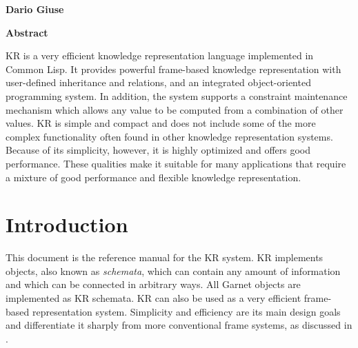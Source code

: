 \begin{titlepage}
\begin{titlebox}
\vspace{0.6 inch}

{\bf Dario Giuse}
\vspace{0.3 line}
\value{date}
\end{titlebox}
\vspace{0.1 inch}
\begin{center}
{\bf Abstract}\end{center}
\begin{text}
KR is a very efficient knowledge representation language implemented in
Common Lisp.  It provides powerful frame-based knowledge representation
with user-defined inheritance and relations, and an integrated
object-oriented programming system.  In addition, the system supports a
constraint maintenance mechanism which allows any value to be computed from
a combination of other values.  KR is simple and compact and does not
include some of the more complex functionality often found in other
knowledge representation systems.  Because of its simplicity, however, it
is highly optimized and offers good performance.  These qualities make it
suitable for many applications that require a mixture of good performance
and flexible knowledge representation.


\vspace{0.3 inch}

\end{text}
\end{titlepage}






\chapter{Introduction}
\value{top}


This document is the reference manual for the KR system.  KR implements
objects, also known as {\it schemata}, which can contain any amount of
information
and which can be connected in arbitrary ways.  All Garnet objects are
implemented as KR schemata.  KR \cite{kr} can also be used as a very
efficient frame-based representation system.  Simplicity and efficiency are
its main design goals and differentiate it sharply from more
conventional frame systems, as discussed in \cite{KR-KER}.

